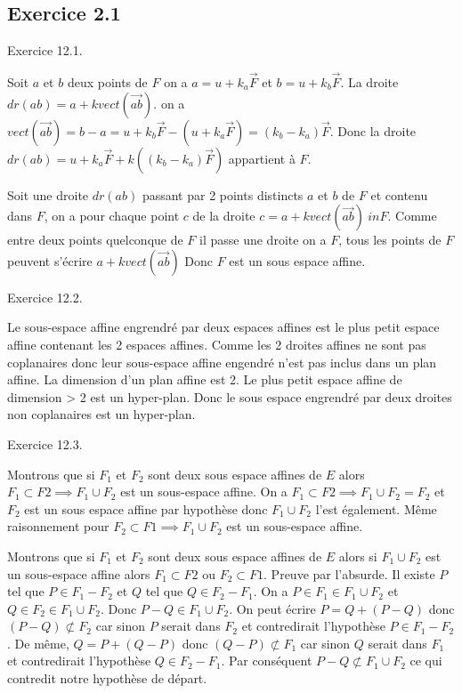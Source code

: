 \documentclass[]{book}
\theoremstyle{definition}
\begin{document}
\subsection*{Exercice 2.1}

Exercice 12.1.

Soit $a$ et $b$ deux points de $F$ on a $a = u + k_a\overrightarrow{F}$ et $b = u + k_b\overrightarrow{F}$. La droite $dr(ab) = a + k vect(\overrightarrow{ab})$. on a $vect(\overrightarrow{ab}) = b - a =  u + k_b\overrightarrow{F} - (u + k_a\overrightarrow{F}) = (k_b - k_a)\overrightarrow{F}$. Donc la droite $dr(ab) = u + k_a\overrightarrow{F} + k((k_b - k_a)\overrightarrow{F})$ appartient \`a $F$.

Soit une droite $dr(ab)$ passant par 2 points distincts $a$ et $b$ de $F$ et contenu dans $F$, on a pour chaque point $c$ de la droite $c = a + k vect(\overrightarrow{ab}) \ in F$.  Comme entre deux points quelconque de $F$ il passe une droite on a $F$, tous les points de $F$ peuvent s'\'ecrire $a + k vect(\overrightarrow{ab})$ Donc $F$ est un sous espace affine. 

Exercice 12.2.

Le sous-espace affine engrendr\'e par deux espaces affines est le plus petit espace affine contenant les 2 espaces affines. Comme les 2 droites affines ne sont pas coplanaires donc leur sous-espace affine engendré n'est pas inclus dans un plan affine. La dimension d'un plan affine est 2. Le plus petit espace affine de dimension > 2 est un hyper-plan. Donc le sous espace engrendr\'e par deux droites non coplanaires est un hyper-plan.


Exercice 12.3.

Montrons que si $F_1$ et $F_2$ sont deux sous espace affines de $E$ alors $F_1 \subset F2 \implies F_1 \cup F_2$ est un sous-espace affine. On a $F_1 \subset F2 \implies F_1 \cup F_2 = F_2$ et $F_2$ est un sous espace affine par hypoth\`ese donc $F_1 \cup F_2$ l'est \'egalement. M\^eme raisonnement pour $F_2 \subset F1 \implies F_1 \cup F_2$ est un sous-espace affine.

Montrons que si $F_1$ et $F_2$ sont deux sous espace affines de $E$ alors si $F_1 \cup F_2$ est un sous-espace affine alors $F_1 \subset F2$ ou $F_2 \subset F1$. Preuve par l'absurde. Il existe $P$ tel que $P \in F_1 - F_2$ et $Q$ tel que $Q \in F_2 - F_1$. On a $P \in F_1 \in F_1 \cup F_2$ et $Q \in F_2 \in F_1 \cup F_2$. Donc $P-Q \in F_1 \cup F_2$.
On peut \'ecrire $P = Q + (P-Q)$ donc $(P-Q) \not \subset F_2$ car sinon $P$ serait dans $F_2$ et contredirait l'hypoth\`ese $P \in F_1 - F_2$. De m\^eme, $Q = P + (Q-P)$ donc $(Q-P) \not \subset F_1$ car sinon $Q$ serait dans $F_1$ et contredirait l'hypoth\`ese $Q \in F_2 - F_1$. Par cons\'equent $P-Q \not \subset F_1 \cup F_2$ ce qui contredit notre hypoth\`ese de d\'epart.
\end{document}
